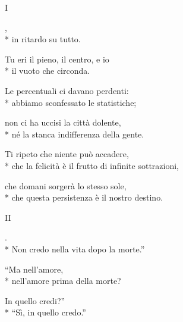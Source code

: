 \documentclass[12pt]{book}
\begin{document}
\begin{poem}{I}{}

\settowidth{\versewidth}{non meno è ciò che meriti.}
\begin{changemargin}{-1cm}{-2cm} 
\begin{altverse}
\quad \qquad {},\\*
in ritardo su tutto.
\end{altverse}

\begin{altverse}
Tu eri il pieno, il centro, e io \\*
il vuoto che circonda.
\end{altverse}

\begin{altverse}
Le percentuali ci davano perdenti: \\*
abbiamo sconfessato le statistiche;
\end{altverse}

\begin{altverse}
non ci ha uccisi la città dolente, \\*
né la stanca indifferenza della gente.
\end{altverse}

\begin{altverse}
Ti ripeto che niente può accadere, \\*
che la felicità è il frutto di infinite sottrazioni,
\end{altverse}

\begin{altverse}
che domani sorgerà lo stesso sole, \\*
che questa persistenza è il nostro destino.
\end{altverse}
\end{changemargin}
\end{poem}

\begin{poem}{II}{}

\settowidth{\versewidth}{non meno è ciò che meriti.}

\begin{altverse}
.\\*
Non credo nella vita dopo la morte.”
\end{altverse}

\begin{altverse}
“Ma nell’amore, \\*
nell’amore prima della morte?
\end{altverse}

\begin{altverse}
In quello credi?” \\*
“Sì, in quello credo.”
\end{altverse}

\end{poem}
\end{document}
